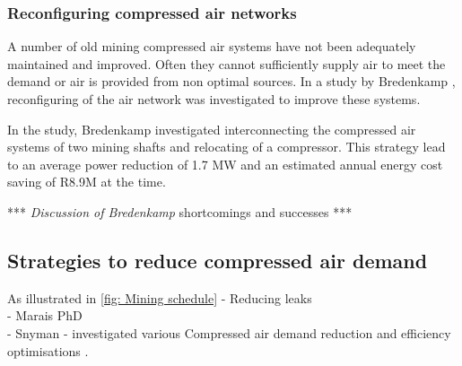 		\subsubsection{Reconfiguring compressed air networks}
			A number of old mining compressed air systems  have not been adequately maintained and improved. Often they cannot sufficiently supply air to meet the demand or air is provided from non optimal sources. In a study by Bredenkamp \cite{Bredenkamp2013Masters}, reconfiguring of the air network was investigated to improve these systems.
			\par  
			In the study, Bredenkamp investigated interconnecting the compressed air systems of two mining shafts and relocating of a compressor. This strategy lead to an average power reduction of 1.7 MW and an estimated annual energy cost saving of R8.9M at the time.
			\par 
			*** \textit{Discussion of Bredenkamp} shortcomings and successes ***
			
	\subsection{Strategies to reduce compressed air demand}
	As illustrated in \cref{fig: Mining schedule}
		- Reducing leaks\\
		- Marais PhD\\
		- Snyman - investigated various Compressed air demand reduction and efficiency
		 optimisations \cite{Snyman2011Masters}.
		 
